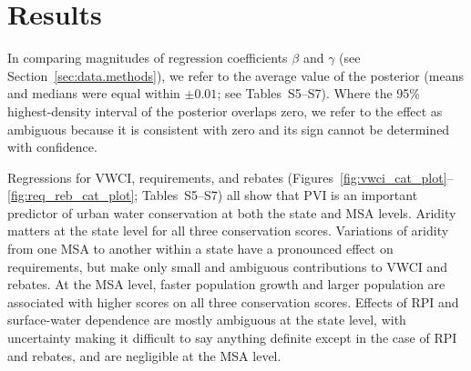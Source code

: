 \documentclass[draft,linenumbers]{agujournal}\usepackage{knitr}
\begin{document}
\section{Results}
In comparing magnitudes of regression coefficients $\beta$ and $\gamma$ (see Section~\ref{sec:data.methods}), we refer to the average value of the posterior (means and medians were equal within $\pm 0.01$; see Tables~S5--S7). Where the 95\% highest-density interval of the posterior overlaps zero, we refer to the effect as ambiguous because it is consistent with zero and its sign cannot be determined with confidence.

Regressions for VWCI, requirements, and rebates (Figures~\ref{fig:vwci_cat_plot}--\ref{fig:req_reb_cat_plot}; Tables~S5--S7) all show that PVI is an important predictor of urban water conservation at both the state and MSA levels. Aridity matters at the state level for all three conservation scores. Variations of aridity from one MSA to another within a state have a pronounced effect on requirements, but make only small and ambiguous contributions to VWCI and rebates. At the MSA level, faster population growth and larger population are associated with higher scores on all three conservation scores. Effects of RPI and surface-water dependence are mostly ambiguous at the state level, with uncertainty making it difficult to say anything definite except in the case of RPI and rebates, and are negligible at the MSA level.
%
%
\end{document}
